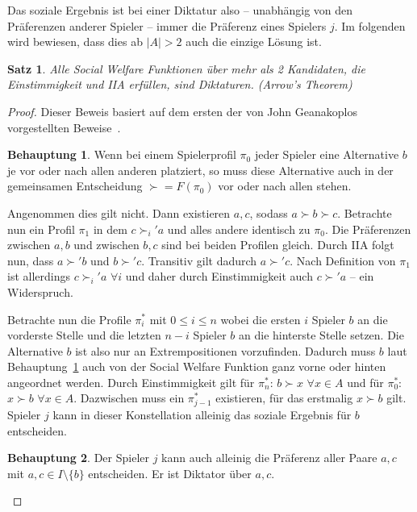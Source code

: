 \documentclass[a4paper,11pt]{article}
\theoremstyle{definition}
\theoremstyle{plain}
\newtheorem{theorem}[definition]{Satz}
\theoremstyle{definition}
\newtheorem{claim}{Behauptung}
\begin{document}
Das soziale Ergebnis ist bei einer Diktatur also -- unabhängig von den Präferenzen anderer Spieler -- immer die Präferenz eines Spielers $j$.
Im folgenden wird bewiesen, dass dies ab $|A| > 2$ auch die einzige Lösung ist.

\begin{theorem}
	Alle Social Welfare Funktionen über mehr als 2 Kandidaten, die Einstimmigkeit und IIA erfüllen, sind Diktaturen. (Arrow's Theorem)
\end{theorem}

\begin{proof}
	Dieser Beweis basiert auf dem ersten der von John Geanakoplos vorgestellten Beweise~\cite{gea05}.
	
	\begin{claim} 
		\label{claim:extrementsch}
		Wenn bei einem Spielerprofil $\pi_0$ jeder Spieler eine Alternative $b$ je vor oder nach allen anderen platziert, so muss diese Alternative auch in der gemeinsamen Entscheidung $\succ = F(\pi_0)$ vor oder nach allen stehen.
	\end{claim}

	Angenommen dies gilt nicht. Dann existieren $a, c$, sodass $a \succ b \succ c$. Betrachte nun ein Profil $\pi_1$ in dem $c \succ_i' a$ und alles andere identisch zu $\pi_0$. Die Präferenzen zwischen $a, b$ und zwischen $b, c$ sind bei beiden Profilen gleich. Durch IIA folgt nun, dass $a \succ' b$ und $b \succ' c$. Transitiv gilt dadurch $a \succ' c$. Nach Definition von $\pi_1$ ist allerdings $c \succ_i' a$ $\forall i$ und daher durch Einstimmigkeit auch $c \succ' a$ -- ein Widerspruch.
	
	Betrachte nun die Profile $\pi_i^*$ mit $0 \leq i \leq n$ wobei die ersten $i$ Spieler $b$ an die vorderste Stelle und die letzten $n-i$ Spieler $b$ an die hinterste Stelle setzen. Die Alternative $b$ ist also nur an Extrempositionen vorzufinden. Dadurch muss $b$ laut Behauptung~\ref{claim:extrementsch} auch von der Social Welfare Funktion ganz vorne oder hinten angeordnet werden. Durch Einstimmigkeit gilt für $\pi_n^*$: $b \succ x$ $\forall x \in A$ und für $\pi_0^*$:  $x \succ b$ $\forall x \in A$. Dazwischen muss ein $\pi_{j-1}^*$ existieren, für das erstmalig $x \succ b$ gilt. Spieler $j$ kann in dieser Konstellation alleinig das soziale Ergebnis für $b$ entscheiden.
	
	\begin{claim}
		\label{claim:jdiktac}
		Der Spieler $j$ kann auch alleinig die Präferenz aller Paare $a,c$ mit $a, c \in I \setminus \{b\}$ entscheiden. Er ist Diktator über $a,c$.
	\end{claim}


\end{proof}
\end{document}
